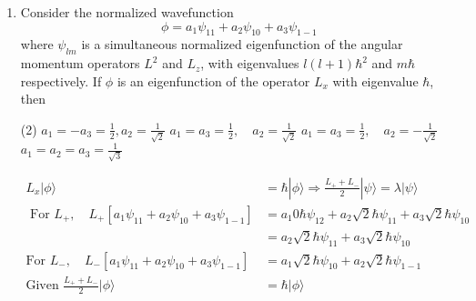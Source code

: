 \begin{enumerate}
If $L$ is the total angular momentum of the particle, the value of $L^{2}$ must be
{}
\begin{tasks}(4)
\task[\textbf{A.}] $2 \hbar^{2}$
\task[\textbf{B.}] $\hbar^{2}$
\task[\textbf{C.}] $4 \hbar^{2}$
\task[\textbf{D.}] $\frac{3}{4} \hbar^{2}$
\end{tasks}
\begin{answer}
\begin{align*}
\psi(r)&=z f(r)=r \cos \theta f(r)\\
\cos \theta&=P_{1}(\cos \theta) \Rightarrow l=1\\
\psi(r, \theta, \varphi)&=P_{1}(\cos \theta) r f(r)
\intertext{the measure at $L^{2}$ have eigen value}
l(l+1) \hbar^{2} \quad\text{ put }l&=1 \quad 1(l+1) \hbar^{2}=2 \hbar^{2}
\end{align*}
So the correct answer is \textbf{Option (A)}
\end{answer}	
\item Consider the normalized wavefunction
$$
\phi=a_{1} \psi_{11}+a_{2} \psi_{10}+a_{3} \psi_{1-1}
$$
where $\psi_{l m}$ is a simultaneous normalized eigenfunction of the angular momentum operators $L^{2}$ and $L_{z}$, with eigenvalues $l(l+1) \hbar^{2}$ and $m \hbar$ respectively. If $\phi$ is an eigenfunction of the operator $L_{x}$ with eigenvalue $\hbar$, then
{}
\begin{tasks}(2)
\task[\textbf{A.}] $a_{1}=-a_{3}=\frac{1}{2}, a_{2}=\frac{1}{\sqrt{2}}$
\task[\textbf{B.}] $a_{1}=a_{3}=\frac{1}{2}, \quad a_{2}=\frac{1}{\sqrt{2}}$
\task[\textbf{C.}] $a_{1}=a_{3}=\frac{1}{2}, \quad a_{2}=-\frac{1}{\sqrt{2}}$
\task[\textbf{D.}] $a_{1}=a_{2}=a_{3}=\frac{1}{\sqrt{3}}$
\end{tasks}
\begin{answer}
\begin{align*}
L_{x}|\phi\rangle&=\hbar|\phi\rangle \Rightarrow \frac{L_{+}+L_{-}}{2}|\psi\rangle=\lambda|\psi\rangle\\
\text{	For }L_{+}, \quad L_{+}\left[a_{1} \psi_{11}+a_{2} \psi_{10}+a_{3} \psi_{1-1}\right]&=a_{1} 0 \hbar \psi_{12}+a_{2} \sqrt{2} \hbar \psi_{11}+a_{3} \sqrt{2} \hbar \psi_{10}\\
&=a_{2} \sqrt{2} \hbar \psi_{11}+a_{3} \sqrt{2} \hbar \psi_{10}\\
\text{For }L_{-}, \quad L_{-}\left[a_{1} \psi_{11}+a_{2} \psi_{10}+a_{3} \psi_{1-1}\right]&=a_{1} \sqrt{2} \hbar \psi_{10}+a_{2} \sqrt{2} \hbar \psi_{1-1}\\
\text{Given }\frac{L_{+}+L_{-}}{2}|\phi\rangle&=\hbar|\phi\rangle\\

\end{align*}
\end{answer}
\end{enumerate}
